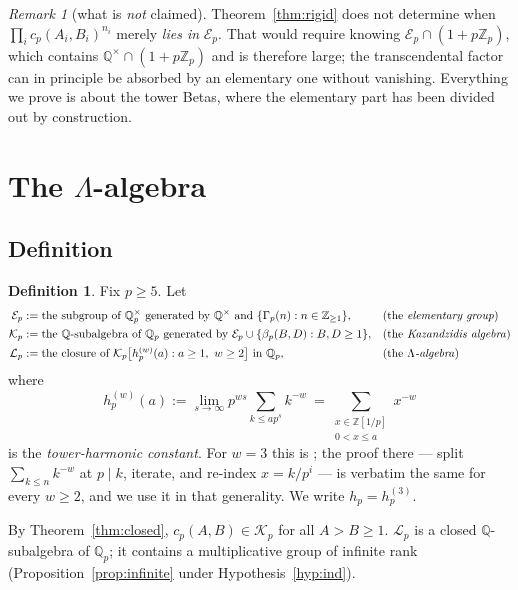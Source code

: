 \documentclass[11pt,reqno]{article}
\newcommand{\Qp}{\mathbb{Q}_p}
\newcommand{\Zp}{\mathbb{Z}_p}
\newcommand{\QQ}{\mathbb{Q}}
\newcommand{\ZZ}{\mathbb{Z}}
\newcommand{\Gp}{\Gamma_p}
\newcommand{\bet}{\beta_p}
\newcommand{\El}{\mathcal{E}_p}
\newcommand{\Kalg}{\mathcal{K}_p}
\newcommand{\Lalg}{\mathcal{L}_p}
\theoremstyle{plain}
\theoremstyle{definition}
\newtheorem{definition}[theorem]{Definition}
\theoremstyle{remark}
\newtheorem{remark}[theorem]{Remark}
\numberwithin{equation}{section}
\begin{document}
\begin{remark}[what is \emph{not} claimed]\label{rem:notclaimed}
Theorem~\ref{thm:rigid} does not determine when $\prod_ic_p(A_i,B_i)^{n_i}$
merely \emph{lies in} $\El$.  That would require knowing
$\El\cap(1+p\Zp)$, which contains $\QQ^\times\cap(1+p\Zp)$ and is therefore
large; the transcendental factor can in principle be absorbed by an elementary
one without vanishing.  Everything we prove is about the tower Betas, where the
elementary part has been divided out by construction.
\end{remark}

\section{The $\Lambda$-algebra}\label{sec:algebra}

\subsection{Definition}

\begin{definition}\label{def:algebras}
Fix $p\ge5$.  Let
\begin{align*}
  \El&:=\text{the subgroup of }\Qp^\times\text{ generated by }\QQ^\times
        \text{ and }\{\Gp(n):n\in\ZZ_{\ge1}\}, &&\text{(the \emph{elementary group})}\\
  \Kalg&:=\text{the }\QQ\text{-subalgebra of }\Qp\text{ generated by }
        \El\cup\{\bet(B,D):B,D\ge1\}, &&\text{(the \emph{Kazandzidis algebra})}\\
  \Lalg&:=\text{the closure of }\Kalg\bigl[h_p^{(w)}(a):a\ge1,\ w\ge2\bigr]
        \text{ in }\Qp, &&\text{(the \emph{$\Lambda$-algebra})}
\end{align*}
where
\[
  h_p^{(w)}(a):=\lim_{s\to\infty}p^{ws}\!\!\sum_{k\le ap^s}\!\!k^{-w}
   \ =\!\!\sum_{\substack{x\in\ZZ[1/p]\\ 0<x\le a}}\!\!x^{-w}
\]
is the \emph{tower-harmonic constant}.  For $w=3$ this is
\cite[Thm.~6.1]{PaperC}; the proof there --- split $\sum_{k\le n}k^{-w}$ at
$p\mid k$, iterate, and re-index $x=k/p^i$ --- is verbatim the same for every
$w\ge2$, and we use it in that generality.  We write $h_p=h_p^{(3)}$.
\end{definition}

By Theorem~\ref{thm:closed}, $c_p(A,B)\in\Kalg$ for all $A>B\ge1$.  $\Lalg$ is a
closed $\QQ$-subalgebra of $\Qp$; it contains a multiplicative group of infinite
rank (Proposition~\ref{prop:infinite} under Hypothesis~\ref{hyp:ind}).
\end{document}
